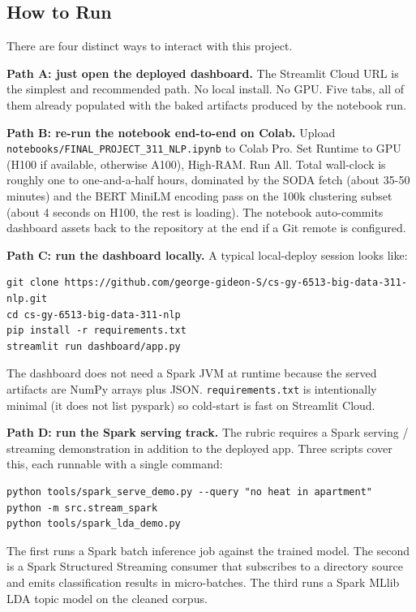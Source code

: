 \documentclass[11pt,letterpaper]{article}
\begin{document}
\subsection{How to Run}

There are four distinct ways to interact with this project.

\textbf{Path A: just open the deployed dashboard.} The Streamlit Cloud URL is the simplest and recommended path. No local install. No GPU. Five tabs, all of them already populated with the baked artifacts produced by the notebook run.

\textbf{Path B: re-run the notebook end-to-end on Colab.} Upload \texttt{notebooks/FINAL\_PROJECT\_311\_NLP.ipynb} to Colab Pro. Set Runtime to GPU (H100 if available, otherwise A100), High-RAM. Run All. Total wall-clock is roughly one to one-and-a-half hours, dominated by the SODA fetch (about 35-50 minutes) and the BERT MiniLM encoding pass on the 100k clustering subset (about 4 seconds on H100, the rest is loading). The notebook auto-commits dashboard assets back to the repository at the end if a Git remote is configured.

\textbf{Path C: run the dashboard locally.} A typical local-deploy session looks like:

\begin{lstlisting}
git clone https://github.com/george-gideon-S/cs-gy-6513-big-data-311-nlp.git
cd cs-gy-6513-big-data-311-nlp
pip install -r requirements.txt
streamlit run dashboard/app.py
\end{lstlisting}

\noindent The dashboard does not need a Spark JVM at runtime because the served artifacts are NumPy arrays plus JSON. \texttt{requirements.txt} is intentionally minimal (it does not list pyspark) so cold-start is fast on Streamlit Cloud.

\textbf{Path D: run the Spark serving track.} The rubric requires a Spark serving / streaming demonstration in addition to the deployed app. Three scripts cover this, each runnable with a single command:

\begin{lstlisting}
python tools/spark_serve_demo.py --query "no heat in apartment"
python -m src.stream_spark
python tools/spark_lda_demo.py
\end{lstlisting}

\noindent The first runs a Spark batch inference job against the trained model. The second is a Spark Structured Streaming consumer that subscribes to a directory source and emits classification results in micro-batches. The third runs a Spark MLlib LDA topic model on the cleaned corpus.
\end{document}

